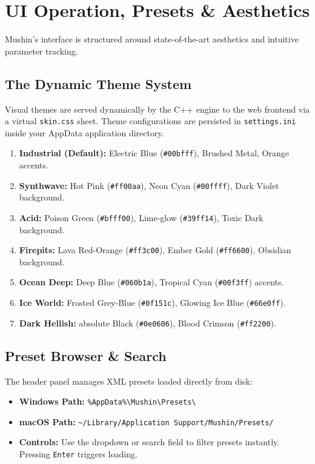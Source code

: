 \documentclass[11pt,a4paper,oneside]{book}
\begin{document}
\chapter{UI Operation, Presets \& Aesthetics}

Mushin's interface is structured around state-of-the-art aesthetics and intuitive parameter tracking.

\section{The Dynamic Theme System}
Visual themes are served dynamically by the C++ engine to the web frontend via a virtual \texttt{skin.css} sheet. Theme configurations are persisted in \texttt{settings.ini} inside your AppData application directory. 
\begin{enumerate}
    \item \textbf{Industrial (Default):} Electric Blue (\texttt{\#00bfff}), Brushed Metal, Orange accents.
    \item \textbf{Synthwave:} Hot Pink (\texttt{\#ff00aa}), Neon Cyan (\texttt{\#00ffff}), Dark Violet background.
    \item \textbf{Acid:} Poison Green (\texttt{\#bfff00}), Lime-glow (\texttt{\#39ff14}), Toxic Dark background.
    \item \textbf{Firepits:} Lava Red-Orange (\texttt{\#ff3c00}), Ember Gold (\texttt{\#ff6600}), Obsidian background.
    \item \textbf{Ocean Deep:} Deep Blue (\texttt{\#060b1a}), Tropical Cyan (\texttt{\#00f3ff}) accents.
    \item \textbf{Ice World:} Frosted Grey-Blue (\texttt{\#0f151c}), Glowing Ice Blue (\texttt{\#66e0ff}).
    \item \textbf{Dark Hellish:} absolute Black (\texttt{\#0e0606}), Blood Crimson (\texttt{\#ff2200}).
\end{enumerate}

\section{Preset Browser \& Search}
The header panel manages XML presets loaded directly from disk:
\begin{itemize}
    \item \textbf{Windows Path:} \texttt{\%AppData\%\textbackslash{}Mushin\textbackslash{}Presets\textbackslash{}}
    \item \textbf{macOS Path:} \texttt{\textasciitilde{}/Library/Application Support/Mushin/Presets/}
    \item \textbf{Controls:} Use the dropdown or search field to filter presets instantly. Pressing \texttt{Enter} triggers loading.
\end{itemize}
\end{document}
